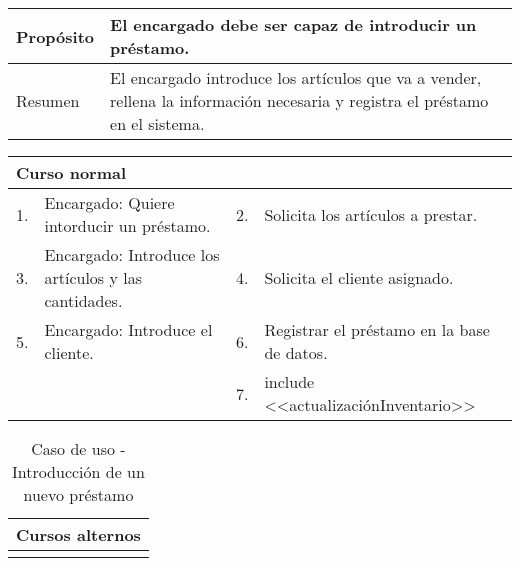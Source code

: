 \begin{table}[H]
	\centering
	\begin{tabular}{| m{} | m{} | m{} | m{} |}
		\hline
		Propósito & \multicolumn{3}{m{0.67\textwidth}|}{El encargado debe ser capaz de introducir un préstamo.}  \\ 
		\hline
		Resumen & \multicolumn{3}{m{0.67\textwidth}|}{El encargado introduce los artículos que va a vender, rellena la información necesaria y registra el préstamo en el sistema.} \\ 
		\hline
	\end{tabular}
\end{table}


\begin{table}[H]
	\centering
	\begin{tabular}{| m{} | m{} | m{} | m{} |}
		\hline
		\multicolumn{4}{|m{0.9\textwidth}|}{Curso normal}     \\ 
		\hline
		1. & Encargado: Quiere intorducir un préstamo. & 2. &  Solicita los artículos a prestar.  \\ 
		\hline
		3. & Encargado: Introduce los artículos y las cantidades. & 4. &  Solicita el cliente asignado.  \\ 
		\hline
		5. & Encargado: Introduce el cliente. & 6. & Registrar el préstamo en la base de datos.  \\ 
		\hline
		&  & 7. &  include <<actualizaciónInventario>>  \\ 
		\hline
	\end{tabular}
\end{table}

\begin{table}[H]
	\centering
	\begin{tabular}{| m{} | m{} | m{} | m{} |}
		\hline
		\multicolumn{4}{|m{0.9\textwidth}|}{Cursos alternos}     \\ 
		\hline
		& \multicolumn{3}{m{0.67\textwidth}|}{} \\ 
		\hline
	\end{tabular}
	\caption{Caso de uso - Introducción de un nuevo préstamo}
\end{table}

\newpage


